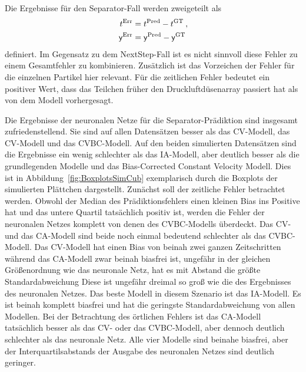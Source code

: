 Die Ergebnisse für den Separator-Fall werden zweigeteilt als
\begin{align*}
    t{^{\text{Err}}} &=  t{^{\text{Pred}}} -  t{^{\text{GT}}} \: ,\\
    \mathsf{y}{^{\text{Err}}} &=  \mathsf{y}{^{\text{Pred}}} -  \mathsf{y}{^{\text{GT}}}
\end{align*}
definiert.
Im Gegensatz zu dem NextStep-Fall ist es nicht sinnvoll diese Fehler zu einem Gesamtfehler zu kombinieren.
Zusätzlich ist das Vorzeichen der Fehler für die einzelnen Partikel hier relevant.
Für die zeitlichen Fehler bedeutet ein positiver Wert, 
dass das Teilchen früher den Druckluftdüsenarray passiert hat als von dem Modell vorhergesagt. 


Die Ergebnisse der neuronalen Netze für die Separator-Prädiktion sind insgesamt zufriedenstellend.
Sie sind auf allen Datensätzen besser als das CV-Modell, das CV-Modell und das CVBC-Modell.
Auf den beiden simulierten Datensätzen sind die Ergebnisse ein wenig schlechter als das IA-Modell, 
aber deutlich besser als die grundlegenden Modelle und das Bias-Corrected Constant Velocity Modell.
Dies ist in Abbildung~\ref{fig:BoxplotsSimCub} exemplarisch durch die Boxplots der simulierten Plättchen dargestellt.
Zunächst soll der zeitliche Fehler betrachtet werden.
Obwohl der Median des Prädiktionsfehlers einen kleinen Bias ins Positive hat und das untere Quartil tatsächlich positiv ist, werden die Fehler der neuronalen Netzes komplett von denen des CVBC-Modells überdeckt.
Das CV- und das CA-Modell sind beide noch einmal bedeutend schlechter als das CVBC-Modell.
Das CV-Modell hat einen Bias von beinah zwei ganzen Zeitschritten während das CA-Modell zwar beinah biasfrei ist, ungefähr in der gleichen Größenordnung wie das neuronale Netz, hat es mit Abstand die größte Standardabweichung
Diese ist ungefähr dreimal so groß wie die des Ergebnisses des neuronalen Netzes.
Das beste Modell in diesem Szenario ist das IA-Modell.
Es ist beinah komplett biasfrei und hat die geringste Standardabweichung von allen Modellen.
Bei der Betrachtung des örtlichen Fehlers ist das CA-Modell tatsächlich besser als das CV- oder das CVBC-Modell, aber dennoch deutlich schlechter als das neuronale Netz.
Alle vier Modelle sind beinahe biasfrei, aber der Interquartilsabstands der Ausgabe des neuronalen Netzes sind deutlich geringer. 

